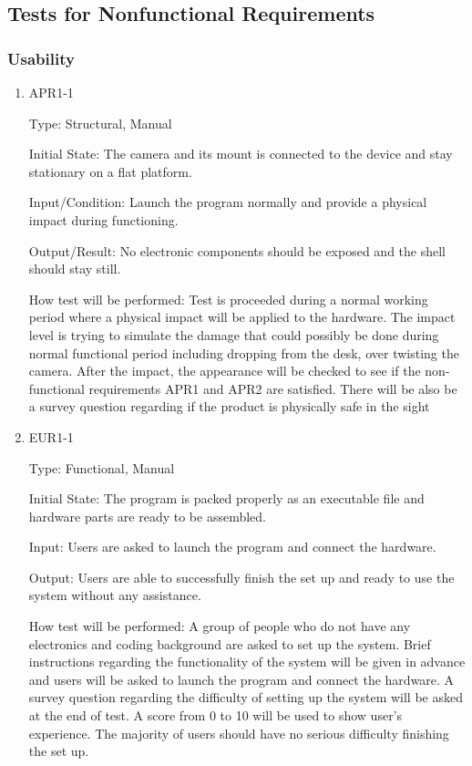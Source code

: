 \documentclass[12pt, titlepage]{article}
\begin{document}
\subsection{Tests for Nonfunctional Requirements}




\subsubsection{Usability}
		
\begin{enumerate}

\item{APR1-1\\}

Type: Structural, Manual
					
Initial State: The camera and its mount is connected to the device and stay stationary on a flat platform.
					
Input/Condition: Launch the program normally and provide a physical impact during functioning.
					
Output/Result: No electronic components should be exposed and the shell should stay still.
					
How test will be performed: Test is proceeded during a normal working period where a physical impact will be applied to the hardware. The impact level is trying to simulate the damage that could possibly be done during normal functional period including dropping from the desk, over twisting the camera. After the impact, the appearance will be checked to see if the non-functional
requirements APR1 and APR2 are satisfied. There will be also be a survey question regarding if the product is physically safe in the sight
					
\item{EUR1-1\\}

Type: Functional, Manual
					
Initial State: The program is packed properly as an executable file and hardware parts are ready to be assembled.
					
Input: Users are asked to launch the program and connect the hardware. 
					
Output: Users are able to successfully finish the set up and ready to use the system without any assistance.
					
How test will be performed: A group of people who do not have any electronics and coding background are asked to set up the system. Brief instructions regarding the functionality of the system will be given in advance and users will be asked to launch the program and connect the hardware. A survey question regarding the difficulty of setting up the system will be asked at the end of test. A score from 0 to 10 will be used to show user's experience. The majority of users should have no serious difficulty finishing the set up.


\end{enumerate}
\end{document}
